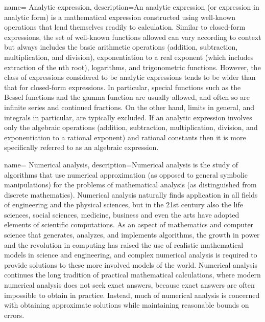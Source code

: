 {
        name= Analytic expression,
        description={An analytic expression (or expression in analytic form) is a mathematical expression constructed using well-known operations that lend themselves readily to calculation. Similar to closed-form expressions, the set of well-known functions allowed can vary according to context but always includes the basic arithmetic operations (addition, subtraction, multiplication, and division), exponentiation to a real exponent (which includes extraction of the nth root), logarithms, and trigonometric functions. However, the class of expressions considered to be analytic expressions tends to be wider than that for closed-form expressions. In particular, special functions such as the Bessel functions and the gamma function are usually allowed, and often so are infinite series and continued fractions. On the other hand, limits in general, and integrals in particular, are typically excluded. If an analytic expression involves only the algebraic operations (addition, subtraction, multiplication, division, and exponentiation to a rational exponent) and rational constants then it is more specifically referred to as an algebraic expression.}
}

{
        name= Numerical analysis,
        description={Numerical analysis is the study of algorithms that use numerical approximation (as opposed to general symbolic manipulations) for the problems of mathematical analysis (as distinguished from discrete mathematics). Numerical analysis naturally finds application in all fields of engineering and the physical sciences, but in the 21st century also the life sciences, social sciences, medicine, business and even the arts have adopted elements of scientific computations. As an aspect of mathematics and computer science that generates, analyzes, and implements algorithms, the growth in power and the revolution in computing has raised the use of realistic mathematical models in science and engineering, and complex numerical analysis is required to provide solutions to these more involved models of the world. Numerical analysis continues the long tradition of practical mathematical calculations, where modern numerical analysis does not seek exact answers, because exact answers are often impossible to obtain in practice. Instead, much of numerical analysis is concerned with obtaining approximate solutions while maintaining reasonable bounds on errors.}
}


